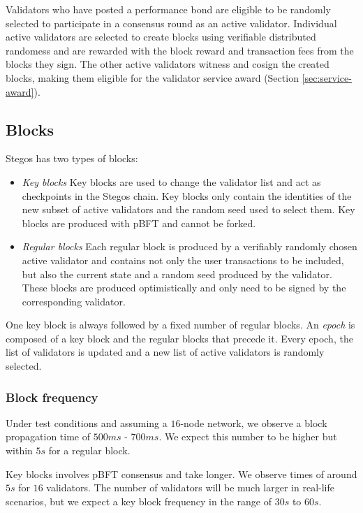\documentclass[8pt,fleqn,openany]{book}
\begin{document}
Validators who have posted a performance bond are eligible to be randomly selected to participate in a consensus round as an active validator. Individual active validators are selected to create blocks using verifiable distributed randomess and are rewarded with the block reward and transaction fees from the blocks they sign. The other active validators witness and cosign the created blocks, making them eligible for the validator service award (Section \ref{sec:service-award}).  

\subsection{Blocks}\label{sec:blocks}
Stegos has two types of blocks:

\begin{itemize}
	\item {\em Key blocks} Key blocks are used to change the validator list and act as checkpoints in the Stegos chain. Key blocks only contain the identities of the new subset of active validators and the random seed used to select them. Key blocks are produced with pBFT and cannot be forked.
	\item {\em Regular blocks} Each regular block is produced by a verifiably randomly chosen active validator and contains not only the user transactions to be included, but also the current state and a random seed produced by the validator. These blocks are produced optimistically and only need to be signed by the corresponding validator.
\end{itemize}

One key block is always followed by a fixed number of regular blocks. An \textit{epoch} is composed of a key block and the regular blocks that precede it. Every epoch, the list of validators is updated and a new list of active validators is randomly selected.

\subsubsection{Block frequency}
Under test conditions and assuming a $16$-node network, we observe a block propagation time of $500ms$ - $700ms$. We expect this number to be higher but within $5s$ for a regular block. 

Key blocks involves pBFT consensus and take longer. We observe times of around $5s$ for $16$ validators. The number of validators will be much larger in real-life scenarios, but we expect a key block frequency in the range of $30s$ to $60s$.
\end{document}

